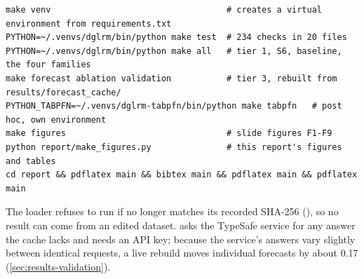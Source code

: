 {\footnotesize
\begin{verbatim}
make venv                                   # creates a virtual environment from requirements.txt
PYTHON=~/.venvs/dglrm/bin/python make test  # 234 checks in 20 files
PYTHON=~/.venvs/dglrm/bin/python make all   # tier 1, S6, baseline, the four families
make forecast ablation validation           # tier 3, rebuilt from results/forecast_cache/
PYTHON_TABPFN=~/.venvs/dglrm-tabpfn/bin/python make tabpfn   # post hoc, own environment
make figures                                # slide figures F1-F9
python report/make_figures.py               # this report's figures and tables
cd report && pdflatex main && bibtex main && pdflatex main && pdflatex main
\end{verbatim}
}

The loader refuses to run if  no longer matches its recorded SHA-256
({\small\ttfamily{}}), so no result can come from an edited
dataset.  asks the TypeSafe service for any answer the cache lacks and needs an API key;
because the service's answers vary slightly between identical requests, a live rebuild moves individual forecasts by
about 0.17\pp{} (\cref{sec:results-validation}).
